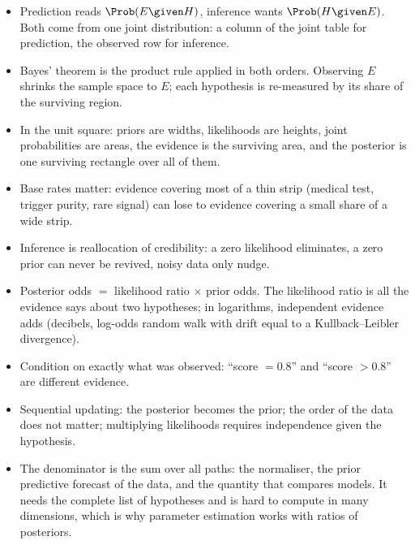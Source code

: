\begin{recap}
\begin{itemize}[itemsep=2pt,leftmargin=1.2em]
  \item Prediction reads $\Prob(E\given H)$, inference wants $\Prob(H\given E)$. Both
        come from one joint distribution: a column of the joint table for prediction,
        the observed row for inference.
  \item Bayes' theorem is the product rule applied in both orders. Observing $E$
        shrinks the sample space to $E$; each hypothesis is re-measured by its share of
        the surviving region.
  \item In the unit square: priors are widths, likelihoods are heights, joint
        probabilities are areas, the evidence is the surviving area, and the posterior
        is one surviving rectangle over all of them.
  \item Base rates matter: evidence covering most of a thin strip (medical test,
        trigger purity, rare signal) can lose to evidence covering a small share of
        a wide strip.
  \item Inference is reallocation of credibility: a zero likelihood eliminates, a zero
        prior can never be revived, noisy data only nudge.
  \item Posterior odds $=$ likelihood ratio $\times$ prior odds. The likelihood ratio is
        all the evidence says about two hypotheses; in logarithms, independent evidence
        adds (decibels, log-odds random walk with drift equal to a Kullback--Leibler
        divergence).
  \item Condition on exactly what was observed: ``score $=0.8$'' and ``score $>0.8$'' are
        different evidence.
  \item Sequential updating: the posterior becomes the prior; the order of the data
        does not matter; multiplying likelihoods requires independence given the
        hypothesis.
  \item The denominator is the sum over all paths: the normaliser, the prior
        predictive forecast of the data, and the quantity that compares models. It
        needs the complete list of hypotheses and is hard to compute in many
        dimensions, which is why parameter estimation works with ratios of posteriors.
\end{itemize}
\end{recap}

